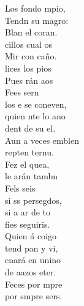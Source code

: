 \documentclass[12pt]{article}
\begin{document}
\begin{multicols*}{2}
\begin{cancion}
            Los  fondo mpio,\\
            Tendn su magro:\\
            Blan el coran. \\
            cillos cual os \\
            Mir con caño.\\
            lices los pios\\
            Pues rán aos\\
        \jump
            Fees sern\\
            los e se coneven,\\
            quien nte lo ano\\
            dent de su el.\\
            Aun a veces emblen\\
            repten ternu.\\
            Fez el quea,\\
            le arán tambn\\
        \jump
            Fels seis \\
            si ss persegdos,\\
            si a ar de to\\
            fies seguiris.\\
            Quien á coigo\\
            tend pan y vi,  \\
            enará en unino\\
            de aazos eter.\\
            Feces por mpre\\
            por smpre sers.\\\jump\\

\end{cancion}
\end{multicols*}
\end{document}
